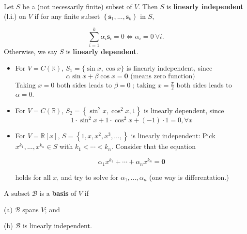 \begin{definition} Let \(S\) be a (not necessarily finite) subset of \(V\). Then \(S\) is {\bf linearly independent} (l.i.) on \(V\) if for any finite subset \(\left\{  {{\mathbf{s}}_1,\ldots ,{\mathbf{s}}_{k}}\right\}\) in \(S\),

\[
\mathop{\sum }\limits_{{i = 1}}^{k}\alpha_{i}{\mathbf{s}}_{i} = 0 \Leftrightarrow  \alpha_{i} = 0\ \forall i.
\]
Otherwise, we say $S$ is {\bf linearly dependent}.
\end{definition}

\begin{example}
\leavevmode
\begin{itemize}
\item For \(V = C\left( \mathbb{R}\right)\), \({S}_1 = \{ \sin x,\cos x\}\) is linearly independent, since
\[
\alpha \sin x + \beta \cos x = \mathbf{0}\text{ (means zero function) }
\]
Taking \(x = 0\) both sides leads to \(\beta  = 0\) ; taking \(x = \frac{\pi }2\) both sides leads to \(\alpha  = 0\).

\item For \(V = C\left( \mathbb{R}\right)\), \({S}_2 = \left\{  {{\sin }^2x,{\cos }^2x,1}\right\}\) is linearly dependent, since
\[
1 \cdot  {\sin }^2x + 1 \cdot  {\cos }^2x + \left( {-1}\right)  \cdot  1 = 0,\forall x
\]

\item For \(V = \mathbb{R}\left\lbrack  x\right\rbrack\), \(S = \left\{  {1,x,{x}^2,{x}^{3},\ldots ,}\right\}\) is linearly independent: Pick \({x}^{{k}_1},\ldots ,{x}^{{k}_n} \in  S\) with \({k}_1 < \cdots  < {k}_n\). Consider that the equation

\[
\alpha_1{x}^{{k}_1} + \cdots  + \alpha_n{x}^{{k}_n} = \mathbf{0}
\]

holds for all \(x\), and try to solve for \(\alpha_1,\ldots ,\alpha_n\) (one way is differentation.)
\end{itemize}
\end{example}


\begin{definition}[Basis] A subset \(\mathcal B\) is a {\bf basis} of \(V\) if

(a) \(\mathcal B\) spans \(V\); and

(b) \(\mathcal B\) is linearly independent.
\end{definition}


